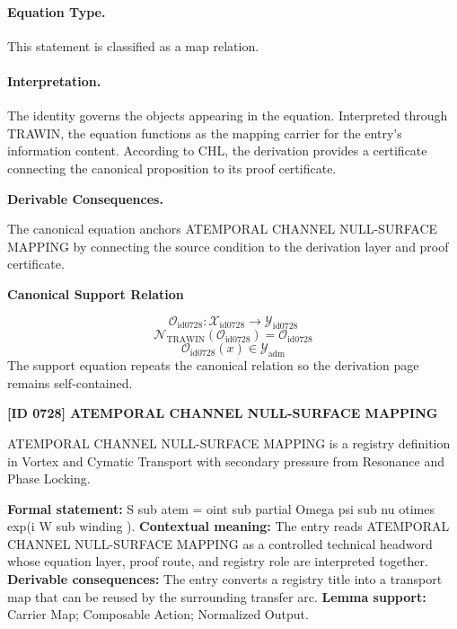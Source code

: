 \paragraph{Equation Type.}
This statement is classified as a map relation.

\paragraph{Interpretation.}
The identity governs the objects appearing in the equation. Interpreted through TRAWIN, the equation functions as the mapping carrier for the entry’s information content. According to CHL, the derivation provides a certificate connecting the canonical proposition to its proof certificate.

\par\vspace{0.35em}
\noindent\textbf{Derivable Consequences.}\quad
\begingroup
\footnotesize
\raggedright
The canonical equation anchors ATEMPORAL CHANNEL NULL-SURFACE MAPPING by connecting the source condition to the derivation layer and proof certificate.
\par\endgroup

\noindent\textbf{Canonical Support Relation}\par
\[
\mathcal{O}_{\mathrm{id0728}}:\mathcal{X}_{\mathrm{id0728}}\longrightarrow\mathcal{Y}_{\mathrm{id0728}}
\]
\[
\mathcal{N}_{\mathrm{TRAWIN}}(\mathcal{O}_{\mathrm{id0728}})=\mathcal{O}_{\mathrm{id0728}}
\]
\[
\mathcal{O}_{\mathrm{id0728}}(x)\in\mathcal{Y}_{\mathrm{adm}}
\]
\noindent The support equation repeats the canonical relation so the derivation page remains self-contained.\par

\clearpage
\noindent\textbf{[ID 0728] ATEMPORAL CHANNEL NULL-SURFACE MAPPING}\par
\vspace{0.35em}
\begingroup\small
{}
ATEMPORAL CHANNEL NULL-SURFACE MAPPING is a registry definition in Vortex and Cymatic Transport with secondary pressure from Resonance and Phase Locking.

\begingroup\footnotesize\setlength{\emergencystretch}{3em}\sloppy
\textbf{Formal statement:} S sub atem = oint sub partial Omega psi sub nu otimes exp(i W sub winding ). \textbf{Contextual meaning:} The entry reads ATEMPORAL CHANNEL NULL-SURFACE MAPPING as a controlled technical headword whose equation layer, proof route, and registry role are interpreted together. \textbf{Derivable consequences:} The entry converts a registry title into a transport map that can be reused by the surrounding transfer arc. \textbf{Lemma support:} Carrier Map; Composable Action; Normalized Output.\par
\endgroup

